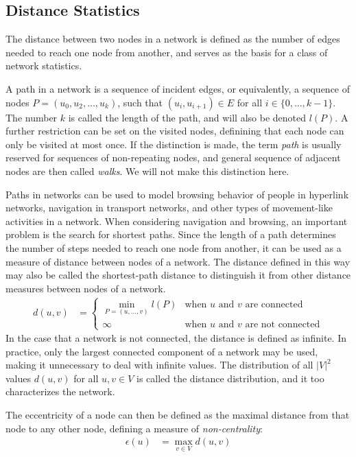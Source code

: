 \documentclass{article}
\begin{document}
\subsection{Distance Statistics}
\label{sec:distance-statistics}
The distance between two nodes in a network is defined as the number of
edges needed to reach one node from another, and serves as the basis for
a class of network statistics.

A path in a network is a sequence of incident edges, or equivalently, a
sequence of nodes $P = (u_0, u_2, \dotsc, u_k)$, such that $(u_i,
u_{i+1})\in E$ for all $i \in \{0, \dotsc, k-1\}$.  The number $k$ is
called the length of the path, and will also be denoted $l(P)$.  A
further restriction can be set on the visited nodes, definining that
each node can only be visited at most once. If the distinction is made,
the term \emph{path} is usually reserved for sequences of non-repeating
nodes, and general sequence of adjacent nodes are then called
\emph{walks}.  We will not make this distinction here.

Paths in networks can be used to model browsing behavior of people in
hyperlink networks, navigation in transport networks, and other types of
movement-like activities in a network.  When considering navigation and
browsing, an important problem is the search for shortest paths.  Since
the length of a path determines the number of steps needed to reach one
node from another, it can be used as a measure of distance between nodes
of a network.  The distance defined in this way may also be called the
shortest-path distance to distinguish it from other distance measures
between nodes of a network.
\begin{align}
  d(u, v) &= \left\{ \begin{array} {ll} \min_{P=(u, \dotsc, v)} l(P) &
    \text{when $u$ and $v$ are connected} \\ \infty & \text{when $u$ and
      $v$ are not connected}
  \end{array} \right. 
\end{align}
In the case that a network is not connected, the distance is defined as
infinite.  In practice, only the largest connected component of a
network may be used, making it unnecessary to deal with infinite values.
The distribution of all $|V|^2$ values $d(u,v)$ for all $u,v\in V$ is
called the distance distribution, and it too characterizes the network.

The eccentricity of a node can then be defined as the maximal distance
from that node to any other node, defining a measure of
\emph{non-centrality}:
\begin{align}
  \epsilon(u) &= \max_{v\in V} d(u,v)
\end{align}
\end{document}
